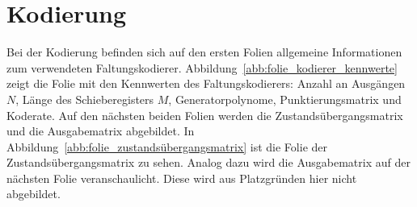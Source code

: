 \section{Kodierung}
\label{kapitel:visualisierung_kodierung}
Bei der Kodierung befinden sich auf den ersten Folien allgemeine Informationen zum verwendeten Faltungskodierer. Abbildung~\ref{abb:folie_kodierer_kennwerte} zeigt die Folie mit den Kennwerten des Faltungskodierers: Anzahl an Ausgängen $N$, Länge des Schieberegisters $M$, Generatorpolynome, Punktierungsmatrix und Koderate. Auf den nächsten beiden Folien werden die Zustandsübergangsmatrix und die Ausgabematrix abgebildet. In Abbildung~\ref{abb:folie_zustandsübergangsmatrix} ist die Folie der Zustandsübergangsmatrix zu sehen. Analog dazu wird die Ausgabematrix auf der nächsten Folie veranschaulicht. Diese wird aus Platzgründen hier nicht abgebildet.
